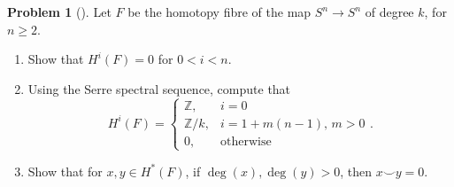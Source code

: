 \documentclass[reqno]{amsart}
\theoremstyle{definition}
\newtheorem{problem}[theorem]{Problem}
\theoremstyle{remark}
\begin{document}
    \begin{problem}[]
        Let $F$ be the homotopy fibre of the map
        $S^{n} \to S^{n}$ of degree $k$, for
        $n\ge 2$.
        \begin{enumerate}
            \item Show that
                $H^{i}(F) = 0$ for $0 < i < n$.
            \item Using the Serre spectral sequence,
                compute that
                \[
                H^{i}(F) = 
                \begin{cases}
                    \mathbb{Z},& i=0\\
                    \mathbb{Z} / k,& i = 1 + m(n-1), \, m>0\\
                    0,& \text{otherwise}
                \end{cases}.
                \] 
            \item Show that for $x,y \in H^{*}(F)$, if
                $\deg (x), \deg (y) > 0$, then
                 $x \smile y = 0$.
        \end{enumerate}
    \end{problem}
\end{document}
